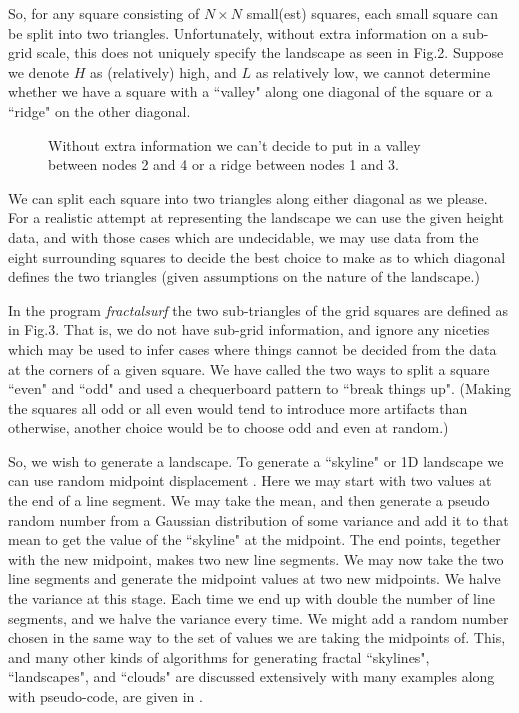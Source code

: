 \documentclass[12pt]{article}
\begin{document}
So, for any square consisting of $N\times N$ small(est) squares, each small square 
can be split into two triangles. Unfortunately, without extra information on a sub-grid scale, this 
does not uniquely specify the landscape as seen in Fig.2. Suppose we denote $H$ as (relatively) high, and
 $L$ as relatively low, we cannot determine whether we have a square with a ``valley" along one diagonal
of the square or a ``ridge" on the other diagonal.
\begin{figure}[htb]
\vspace*{10cm}
\caption{ Without extra information we can't decide to put in a valley between nodes 2 and 4 or a ridge between 
nodes 1 and 3.}
\end{figure}

We can split each square into two triangles along either diagonal as we please. For a realistic attempt at 
representing the landscape we can use the given height data, and with those cases which are undecidable, we may
use data from the eight surrounding squares to decide the best choice to make as to which 
diagonal defines the two triangles (given assumptions on the nature of
the landscape.) 

In the program {\it fractalsurf} the two sub-triangles of the grid squares are defined as in Fig.3.
That is, we do not have sub-grid information, and ignore any niceties which may be used to infer cases
where things cannot be decided from the data at the corners of a given square. We have called the two ways
to split a square ``even" and ``odd" and used a chequerboard pattern to ``break things up". (Making the squares 
 all odd or all even
would tend to introduce more artifacts than otherwise, another choice would be to choose odd and even at random.)

So, we wish to generate a landscape. To generate a ``skyline" or 1D landscape  we can use random midpoint
 displacement \cite{Fractals:Mybib}.
Here we may start with two values at the end of a line segment. We may take the mean, and then generate
a pseudo random number from a Gaussian distribution of some variance and add it to that mean to get the
value of the ``skyline" at the midpoint. The end points, tegether with the new midpoint, makes two new
 line segments.
We may now take the two line segments
and generate the midpoint values at two new midpoints. We halve the variance at this stage. Each time
we end up with double the number of line segments, and we halve the variance every time. We might add
 a random number chosen in the same way to the set of values we are taking the midpoints of.
This, and many other kinds of algorithms for generating fractal ``skylines", ``landscapes", and ``clouds"
are discussed extensively with many examples along with pseudo-code, are given in \cite{Fractals:Mybib}.
\end{document}
